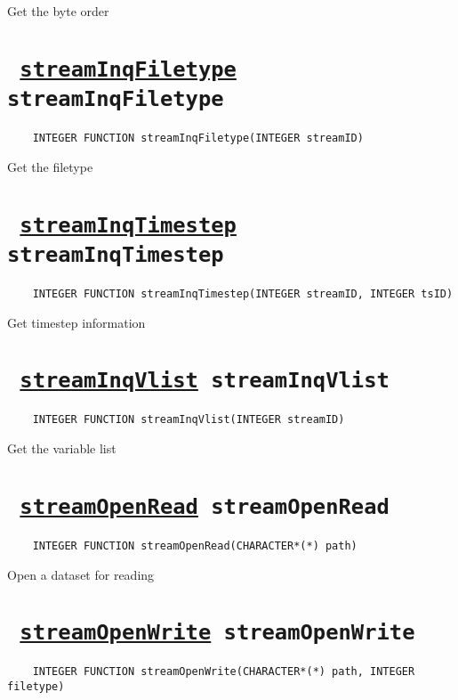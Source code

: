 Get the byte order
\ifpdfoutput{}{(\ref{streamInqByteorder})}


\section*{\texttt{ 
\ifpdf
\hyperref[streamInqFiletype]{streamInqFiletype}
\else
streamInqFiletype
\fi
}}
\begin{verbatim}
    INTEGER FUNCTION streamInqFiletype(INTEGER streamID)
\end{verbatim}

Get the filetype
\ifpdfoutput{}{(\ref{streamInqFiletype})}


\section*{\texttt{ 
\ifpdf
\hyperref[streamInqTimestep]{streamInqTimestep}
\else
streamInqTimestep
\fi
}}
\begin{verbatim}
    INTEGER FUNCTION streamInqTimestep(INTEGER streamID, INTEGER tsID)
\end{verbatim}

Get timestep information
\ifpdfoutput{}{(\ref{streamInqTimestep})}


\section*{\texttt{ 
\ifpdf
\hyperref[streamInqVlist]{streamInqVlist}
\else
streamInqVlist
\fi
}}
\begin{verbatim}
    INTEGER FUNCTION streamInqVlist(INTEGER streamID)
\end{verbatim}

Get the variable list
\ifpdfoutput{}{(\ref{streamInqVlist})}


\section*{\texttt{ 
\ifpdf
\hyperref[streamOpenRead]{streamOpenRead}
\else
streamOpenRead
\fi
}}
\begin{verbatim}
    INTEGER FUNCTION streamOpenRead(CHARACTER*(*) path)
\end{verbatim}

Open a dataset for reading
\ifpdfoutput{}{(\ref{streamOpenRead})}


\section*{\texttt{ 
\ifpdf
\hyperref[streamOpenWrite]{streamOpenWrite}
\else
streamOpenWrite
\fi
}}
\begin{verbatim}
    INTEGER FUNCTION streamOpenWrite(CHARACTER*(*) path, INTEGER filetype)
\end{verbatim}

